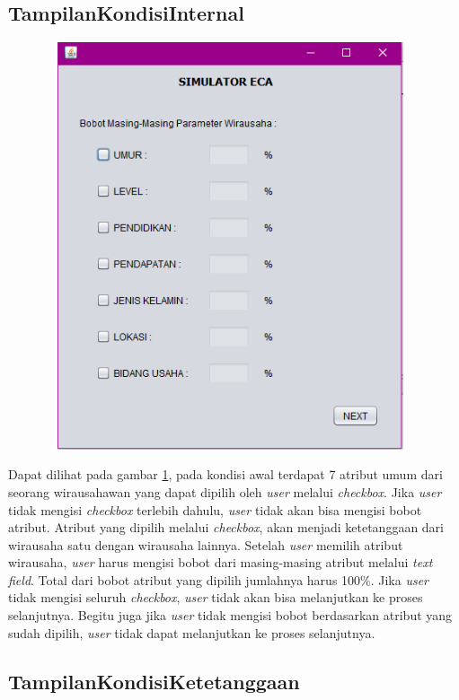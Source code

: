 \subsection{TampilanKondisiInternal}

\begin{figure} [H]
	\centering  
	\includegraphics[width=11cm, height=12cm]{tampilanKondisiInternal} 
	\label{fig:kondisiInternal} 
\end{figure}

Dapat dilihat pada gambar \ref{fig:kondisiInternal}, pada kondisi awal terdapat 7 atribut umum dari seorang wirausahawan yang dapat dipilih oleh \textit{user} melalui \textit{checkbox}. Jika \textit{user} tidak mengisi \textit{checkbox} terlebih dahulu, \textit{user} tidak akan bisa mengisi bobot atribut. Atribut yang dipilih melalui \textit{checkbox}, akan menjadi ketetanggaan dari wirausaha satu dengan wirausaha lainnya. Setelah \textit{user} memilih atribut wirausaha, \textit{user} harus mengisi bobot dari masing-masing atribut melalui \textit{text field}. Total dari bobot atribut yang dipilih jumlahnya harus 100\%. Jika \textit{user} tidak mengisi seluruh  \textit{checkbox}, \textit{user} tidak akan bisa melanjutkan ke proses selanjutnya. Begitu juga jika \textit{user} tidak mengisi bobot berdasarkan atribut yang sudah dipilih, \textit{user} tidak dapat melanjutkan ke proses selanjutnya.

\subsection{TampilanKondisiKetetanggaan}

